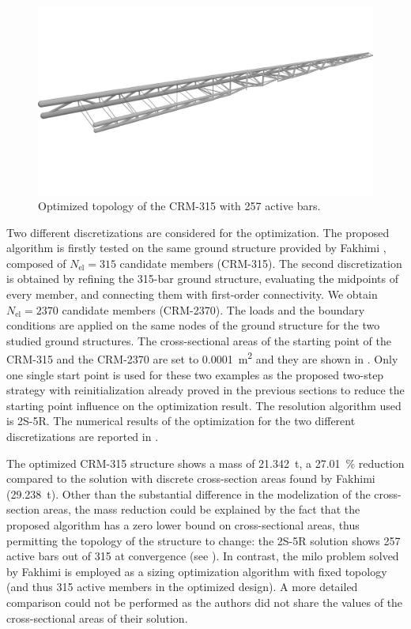     \begin{figure}
        \centering
        \includegraphics[width=0.8\linewidth]{figures/07_aeronautic/15_04_Topology_NLP_iso.png}
         \caption{Optimized topology of the CRM-315 with 257 active bars.}
        \label{fig:07_crm315}
    \end{figure}
    
    Two different discretizations are considered for the optimization. The proposed algorithm is firstly tested on the same ground structure provided by Fakhimi \etal {}, composed of $N_{\text{el}}=315$ candidate members (CRM-315). The second discretization is obtained by refining the 315-bar ground structure, evaluating the midpoints of every member, and connecting them with first-order connectivity. We obtain $N_{\text{el}}=2370$ candidate members (CRM-2370). The loads and the boundary conditions are applied on the same nodes of the ground structure for the two studied ground structures. The cross-sectional areas of the starting point of the CRM-315 and the CRM-2370 are set to \qty{0.0001}{m^2} and they are shown in . Only one single start point is used for these two examples as the proposed two-step strategy with reinitialization already proved in the previous sections to reduce the starting point influence on the optimization result. The resolution algorithm used is 2S-5R. The numerical results of the optimization for the two different discretizations are reported in . 
    
    The optimized CRM-315 structure shows a mass of \qty{21.342}{\tonne}, a \qty{27.01}{\%} reduction compared to the solution with discrete cross-section areas found by Fakhimi \etal {} (\qty{29.238}{\tonne}). Other than the substantial difference in the modelization of the cross-section areas, the mass reduction could be explained by the fact that the proposed algorithm has a zero lower bound on cross-sectional areas, thus permitting the topology of the structure to change: the 2S-5R solution shows 257 active bars out of 315 at convergence (see ). In contrast, the \gls{milo} problem solved by Fakhimi \etal \cite{fakhimi_discrete_2021} is employed as a sizing optimization algorithm with fixed topology (and thus 315 active members in the optimized design). A more detailed comparison could not be performed as the authors did not share the values of the cross-sectional areas of their solution. 
    
